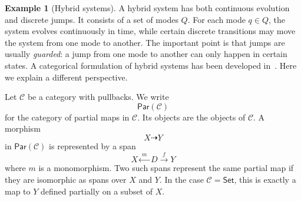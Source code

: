 \documentclass[a4paper,reqno,oneside]{amsart}
\theoremstyle{definition}
\newtheorem{example}[theorem]{Example}
\theoremstyle{remark}
\numberwithin{equation}{section}
\begin{document}
	\begin{example}[Hybrid systems]\label{ex: hybrid guarded}
		A hybrid system has both continuous evolution and discrete jumps. It consists
		of a set of modes $Q$. For each mode $q\in Q$, the system evolves
		continuously in time, while certain discrete transitions may move the system
		from one mode to another. The important point is that jumps are usually
		\emph{guarded}: a jump from one mode to another can only happen in certain states. A categorical formulation of hybrid systems has been developed in~\cite{Am06}. Here we explain a different perspective.
		
		Let $\mathcal C$ be a category with pullbacks. We write
		\begin{equation}
			\mathsf{Par}(\mathcal C)
		\end{equation}
		for the category of partial maps in $\mathcal C$. Its objects are the
		objects of $\mathcal C$. A morphism
		\begin{equation}
			X\dashrightarrow Y
		\end{equation}
		in $\mathsf{Par}(\mathcal C)$ is represented by a span
		\begin{equation}
			X \xleftarrow{\;m\;} D \xrightarrow{\;f\;} Y
		\end{equation}
		where $m$ is a monomorphism. Two such spans represent the same partial map
		if they are isomorphic as spans over $X$ and $Y$. In the case
		$\mathcal C=\mathsf{Set}$, this is exactly a map to $Y$ defined partially on a
		subset of $X$.
		

\end{example}
\end{document}

